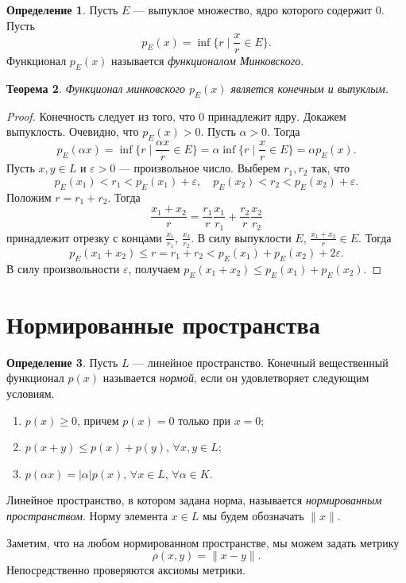 \documentclass[12pt, titlepage, oneside]{amsbook}
\newtheorem{theorem}{Теорема}[chapter]
\theoremstyle{definition}
\newtheorem{definition}[theorem]{Определение}
\theoremstyle{remark}
\begin{document}
\begin{definition}
Пусть $E$ --- выпуклое множество, ядро которого содержит $0$. Пусть $$p_E(x)=\inf\{r\mid\frac{x}{r}\in E\}.$$ Функционал $p_E(x)$ называется \emph{функционалом Минковского}.
\end{definition}

\begin{theorem}
\label{Vyp3}
Функционал минковского $p_E(x)$ является конечным и выпуклым.
\end{theorem}

\begin{proof}
Конечность следует из того, что $0$ принадлежит ядру. Докажем выпуклость. Очевидно, что $p_E(x)>0$. Пусть $\alpha>0$. Тогда $$p_E(\alpha x)=\inf\{r\mid\frac{\alpha x}{r}\in E\}=\alpha\inf\{r\mid\frac{x}{r}\in E\}=\alpha p_E(x).$$ Пусть $x,y\in L$ и $\varepsilon>0$ --- произвольное число. Выберем $r_1,r_2$ так, что $$p_E(x_1)<r_1<p_E(x_1)+\varepsilon,\quad p_E(x_2)<r_2<p_E(x_2)+\varepsilon.$$ Положим $r=r_1+r_2$. Тогда $$\frac{x_1+x_2}{r}=\frac{r_1}{r}\frac{x_1}{r_1}+\frac{r_2}{r}\frac{x_2}{r_2}$$ принадлежит отрезку с концами $\frac{x_1}{r_1}$, $\frac{x_2}{r_2}$. В силу выпуклости $E$, $\frac{x_1+x_2}{r}\in E$. Тогда $$p_E(x_1+x_2)\leq r=r_1+r_2<p_E(x_1)+p_E(x_2)+2\varepsilon.$$ В силу произвольности $\varepsilon$, получаем $p_E(x_1+x_2)\leq p_E(x_1)+p_E(x_2)$.
\end{proof}

\section{Нормированные пространства}

\begin{definition}
Пусть $L$ --- линейное пространство. Конечный вещественный функционал $p(x)$ называется \emph{нормой}, если он удовлетворяет следующим условиям.
\begin{enumerate}
\item $p(x)\geq 0$, причем $p(x)=0$ только при $x=0$;
\item $p(x+y)\leq p(x)+p(y)$, $\forall x,y\in L$;
\item $p(\alpha x)=|\alpha| p(x)$, $\forall x\in L$, $\forall \alpha\in K$.
\end{enumerate}
Линейное пространство, в котором задана норма, называется \emph{нормированным пространством}. Норму элемента $x\in L$ мы будем обозначать $\|x\|$.
\end{definition}

Заметим, что на любом нормированном пространстве, мы можем задать метрику $$\rho(x,y)=\|x-y\|.$$  Непосредственно проверяются аксиомы метрики.
\end{document}
